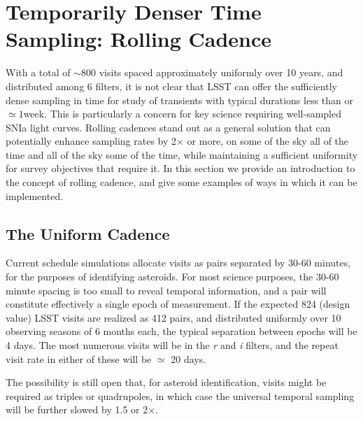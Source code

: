 %
%
%

\section{Temporarily Denser Time Sampling: Rolling Cadence}
\def\secname{rolling}\label{sec:\secname}


With a total of $\sim 800$ visits spaced approximately uniformly over 10
years, and distributed among 6 filters, it is not clear that LSST can
offer the sufficiently dense sampling in time for study of transients
with typical durations less than or $\simeq 1$week. This is particularly
a concern for key science requiring well-sampled SNIa light curves.
Rolling cadences stand out as a general solution that can potentially
enhance sampling rates by 2$\times$ or more, on some of the sky all of
the time and all of the sky some of the time, while maintaining a
sufficient uniformity for survey objectives that require it. In this
section we provide an introduction to the concept of rolling cadence,
and give some examples of ways in which it can be implemented.


\subsection{The Uniform Cadence}

Current schedule simulations allocate visits as pairs separated by 30-60
minutes, for the purposes of identifying asteroids.  For most science
purposes, the 30-60 minute spacing is too small to reveal temporal
information, and a pair will constitute effectively a single epoch of
measurement.  If the expected 824 (design value) LSST visits are
realized as 412 pairs, and distributed uniformly over 10 observing
seasons of 6 months each, the typical separation between epochs will be
4 days.   The most numerous visits will be in the {\it r} and {\it i}
filters, and the repeat visit rate in either of these will be $\simeq$
20 days.

The possibility is still open that, for asteroid identification, visits
might be required as triples or quadrupoles, in which case the universal
temporal sampling will be further slowed by 1.5 or 2$\times$.

